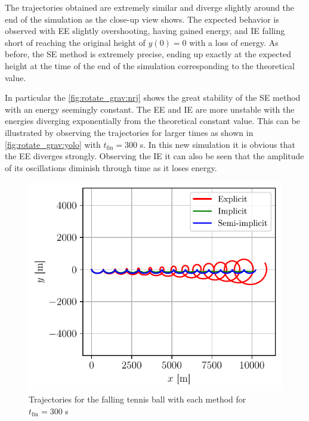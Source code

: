 The trajectories obtained are extremely similar and diverge slightly around the end of the simulation as the close-up view shows. The expected behavior is observed with EE slightly overshooting, having gained energy, and IE falling short of reaching the original height of $y(0) = 0$ with a loss of energy. As before, the SE method is extremely precise, ending up exactly at the expected height at the time of the end of the simulation corresponding to the theoretical value.

In particular the \autoref{fig:rotate_grav:nrj} shows the great stability of the SE method with an energy seemingly constant. The EE and IE are more unstable with the energies diverging exponentially from the theoretical constant value. This can be illustrated by observing the trajectories for larger times as shown in \autoref{fig:rotate_grav:yolo} with $t_\mathrm{fin} = 300$ s. In this new simulation it is obvious that the EE diverges strongly. Observing the IE it can also be seen that the amplitude of its oscillations diminish through time as it loses energy.

\begin{figure}[h]
    \centering
    \includegraphics[width=0.61\linewidth]{figures/rotate_grav_trajectories_yolo.pdf}
    \caption{Trajectories for the falling tennis ball with each method for $t_\mathrm{fin} = 300$ s}
    \label{fig:rotate_grav:yolo}
\end{figure}


